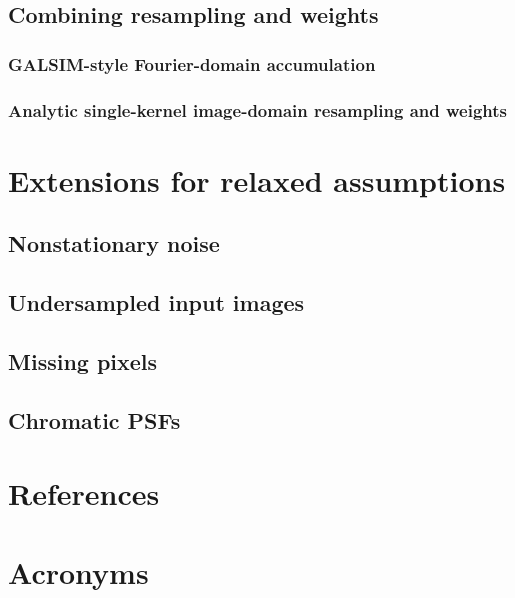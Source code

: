 \documentclass[DM,authoryear,toc]{lsstdoc}
\begin{document}
\subsection{Combining resampling and weights}

\subsubsection{GALSIM-style Fourier-domain accumulation}

\subsubsection{Analytic single-kernel image-domain resampling and weights}

\section{Extensions for relaxed assumptions}

\subsection{Nonstationary noise}

\subsection{Undersampled input images}

\subsection{Missing pixels}

\subsection{Chromatic PSFs}


\appendix
\section{References} \label{sec:bib}
\renewcommand{\refname}{} %


\section{Acronyms} \label{sec:acronyms}

\end{document}

